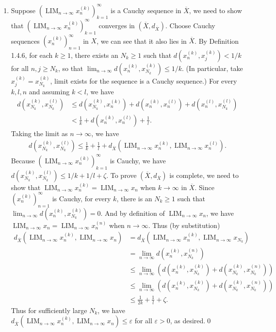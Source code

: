 \documentclass{book}
\DeclareMathOperator{\tlim}{LIM}%
\begin{document}
\begin{enumerate}
    \item Suppose $(\tlim_{n\to\infty}x_n^{(k)})_{k=1}^{\infty}$ is a Cauchy sequence in $\overline X$, we need to show that $(\tlim_{n\to\infty}x_n^{(k)})_{k=1}^{\infty}$ converges in $(\overline X,d_{\overline X})$. Choose Cauchy sequences $(x_n^{(k)})_{n=1}^{\infty}$ in $X$, we can see that it also lies in $\overline X$. By Definition 1.4.6, for each $k\geq 1$, there exists an $N_k\geq 1$ such that $d(x_n^{(k)},x_j^{(k)})<1/k$ for all $n,j\geq N_k$, so that $\lim_{n\to\infty}d(x_n^{(k)},x_{N_k}^{(k)})\leq 1/k$. (In particular, take $x_j^{(k)}=x_{N_k}^{(k)}$, limit exists for the sequence is a Cauchy sequence.) For every $k,l,n$ and assuming $k<l$, we have
        \begin{align*}
            d(x_{N_k}^{(k)},x_{N_k}^{(l)})
            &\leq d(x_{N_k}^{(k)},x_{n}^{(k)})+d(x_{n}^{(k)},x_{n}^{(l)})+d(x_{n}^{(l)},x_{N_k}^{(l)})\\
            &<\frac{1}{k}+d(x_{n}^{(k)},x_{n}^{(l)})+\frac{1}{l}.
        \end{align*}
    Taking the limit as $n\to\infty$, we have
        \begin{align*}
            d(x_{N_k}^{(k)},x_{N_k}^{(l)})\leq\frac{1}{k}+\frac{1}{l}+d_{\overline X}(\tlim_{n\to\infty}x_{n}^{(k)},\tlim_{n\to\infty}x_{n}^{(l)}).
        \end{align*}
    Because $(\tlim_{n\to\infty}x_n^{(k)})_{k=1}^{\infty}$ is Cauchy, we have $d(x_{N_k}^{(k)},x_{N_k}^{(l)})\leq 1/k+1/l+\zeta$. To prove $(\overline X,d_{\overline X})$ is complete, we need to show that $\tlim_{n\to\infty}x_n^{(k)}=\tlim_{n\to\infty}x_n$ when $k\to\infty$ in $\overline X$.
    Since $(x_n^{(k)})_{n=1}^{\infty}$ is Cauchy, for every $k$, there is an $N_k\geq 1$ such that $\lim_{n\to\infty}d(x_n^{(k)},x_{N_k}^{(k)})=0$. And by definition of $\tlim_{n\to\infty}x_n$, we have $\tlim_{n\to\infty}x_n=\tlim_{n\to\infty}x_n^{(n)}$ when $n\to\infty$. Thus (by substitution)
        \begin{align*}
            d_{\overline X}(\tlim_{n\to\infty}x_n^{(k)},\tlim_{n\to\infty}x_n)
            &=d_{\overline X}(\tlim_{n\to\infty}x_n^{(k)},\tlim_{n\to\infty}x_{N_k})\\
            &=\lim_{n\to\infty}d(x_{n}^{(k)},x_{N_k}^{(n)})\\
            &\leq\lim_{n\to\infty}(d(x_n^{(k)},x_{N_k}^{(k)})+d(x_{N_k}^{(k)},x_{N_k}^{(n)}))\\
            &\leq\lim_{n\to\infty}(d(x_n^{(k)},x_{N_k}^{(k)})+d(x_{N_k}^{(k)},x_{N_k}^{(n)}))\\
            &\leq\frac{1}{2k}+\frac{1}{l}+\zeta.
        \end{align*}
    Thus for sufficiently large $N_k$, we have $d_{\overline X}(\tlim_{n\to\infty}x_n^{(k)},\tlim_{n\to\infty}x_n)\leq\varepsilon$ for all $\varepsilon>0$, as desired.\qed


\end{enumerate}
\end{document}
